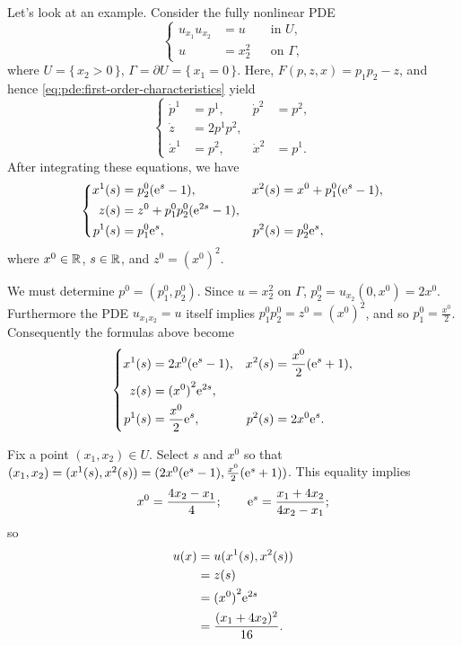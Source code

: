 \begin{example}
  Let's look at an example. Consider the fully nonlinear PDE
  \[
    \tag{\(*\)}
    \left\{
      \begin{aligned}
        u_{x_1}u_{x_2}&=u&&\text{in \(U\),}\\
        u&=x_2^2&&\text{on \(\Gamma\),}
      \end{aligned}
    \right.
  \]
  where \(U=\{\,x_2>0\,\}\), \(\Gamma=\partial U=\{\,x_1=0\,\}\). Here,
  \(F(p,z,x)=p_1p_2-z\), and hence
  \eqref{eq:pde:first-order-characteristics} yield
  \[
    \left\{
      \begin{aligned}
        \dot p^1&=p^1,&\dot p^2&=p^2,\\
        \dot z&=2p^1p^2,\\
        \dot x^1&=p^2,&\dot x^2&=p^1.
      \end{aligned}
    \right.
  \]
After integrating these equations, we have
\[
  \left\{
    \begin{aligned}
      x^1(s)&=p_2^0(\mathrm{e}^s-1),&x^2(s)&=x^0+p_1^0(\mathrm{e}^s-1),\\
      z(s)&=z^0+p_1^0p_2^0(\mathrm{e}^{2s}-1),\\
      p^1(s)&=p_1^0\mathrm{e}^s,&p^2(s)&=p_2^0\mathrm{e}^s,
    \end{aligned}
  \right.
\]
where \(x^0\in\mathbb{R}\), \(s\in\mathbb{R}\), and \(z^0={(x^0)}^2\).

We must determine \(p^0=(p_1^0,p_2^0)\). Since \(u=x_2^2\) on \(\Gamma\),
\(p_2^0=u_{x_2}(0,x^0)=2x^0\). Furthermore the PDE \(u_{x_1x_2}=u\) itself
implies \(p_1^0p_2^0=z^0={(x^0)}^2\), and so \(p_1^0=\frac{x^0}{2}\). Consequently
the formulas above become
\[
  \left\{
    \begin{aligned}
      x^1(s)&=2x^0(\mathrm{e}^s-1),&x^2(s)&=\frac{x^0}{2}(\mathrm{e}^s+1),\\
      z(s)&={(x^0)}^{2}\mathrm{e}^{2s},\\
      p^1(s)&=\frac{x^0}{2}\mathrm{e}^s,&p^2(s)&=2x^0\mathrm{e}^s.
    \end{aligned}
  \right.
\]

Fix a point \((x_1,x_2)\in U\). Select \(s\) and \(x^0\) so that
\((x_1,x_2)=(x^1(s),x^2(s))=(2x^0(\mathrm{e}^s-1),\frac{x^0}{2}(\mathrm{e}^s+1))\). This
equality implies
\[
  x^0=\frac{4x_2-x_1}{4};\qquad \mathrm{e}^s=\frac{x_1+4x_2}{4x_2-x_1};
\]
so
\begin{align*}
  u(x)
  &=u(x^1(s),x^2(s))\\
  &=z(s)\\
  &={(x^0)}^2\mathrm{e}^{2s}\\
  &=\frac{(x_1+4x_2)^2}{16}.
\end{align*}
\end{example}

